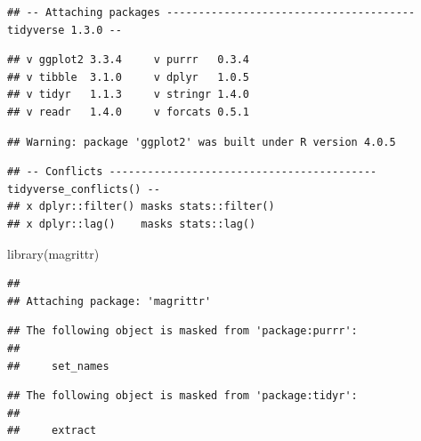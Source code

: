 \documentclass[
]{article}
\newenvironment{Shaded}{\begin{snugshade}}{\end{snugshade}}
\newcommand{\FunctionTok}[1]{\textcolor[rgb]{0.00,0.00,0.00}{#1}}
\newcommand{\NormalTok}[1]{#1}
\begin{document}
\begin{verbatim}
## -- Attaching packages --------------------------------------- tidyverse 1.3.0 --
\end{verbatim}

\begin{verbatim}
## v ggplot2 3.3.4     v purrr   0.3.4
## v tibble  3.1.0     v dplyr   1.0.5
## v tidyr   1.1.3     v stringr 1.4.0
## v readr   1.4.0     v forcats 0.5.1
\end{verbatim}

\begin{verbatim}
## Warning: package 'ggplot2' was built under R version 4.0.5
\end{verbatim}

\begin{verbatim}
## -- Conflicts ------------------------------------------ tidyverse_conflicts() --
## x dplyr::filter() masks stats::filter()
## x dplyr::lag()    masks stats::lag()
\end{verbatim}

\begin{Shaded}
\begin{Highlighting}[]
\FunctionTok{library}\NormalTok{(magrittr)}
\end{Highlighting}
\end{Shaded}

\begin{verbatim}
## 
## Attaching package: 'magrittr'
\end{verbatim}

\begin{verbatim}
## The following object is masked from 'package:purrr':
## 
##     set_names
\end{verbatim}

\begin{verbatim}
## The following object is masked from 'package:tidyr':
## 
##     extract
\end{verbatim}
\end{document}
